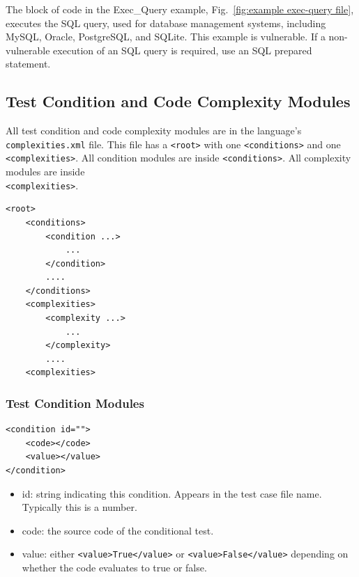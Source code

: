 \documentclass[12pt]{article}
\begin{document}
The block of code in the Exec\_Query example, 
Fig.~\ref{fig:example exec-query file}, executes the SQL query, used 
for database management
systems, including MySQL, Oracle, PostgreSQL, and SQLite.  This example is
vulnerable.  If a non-vulnerable execution of an SQL query is required,
use an SQL prepared statement.


\subsection{Test Condition and Code Complexity Modules}

All test condition and code complexity modules are in the 
language's \verb|complexities.xml| file.  This file has
a \verb|<root>| with one \verb|<conditions>| and one
\verb|<complexities>|.
All condition modules are inside \verb|<conditions>|.  All
complexity modules are inside \\ \verb|<complexities>|.

\begin{verbatim}
<root>
    <conditions>
        <condition ...>
            ...
        </condition>
        ....
    </conditions>
    <complexities>
        <complexity ...>
            ...
        </complexity>
        ....
    <complexities>
\end{verbatim}

\subsubsection{Test Condition Modules}
\label{sec: condition modules}

\begin{verbatim}
<condition id="">
    <code></code>
    <value></value>
</condition>
\end{verbatim}

\begin{itemize}
    \item id: string indicating this condition.  Appears in the test case
      file name.  Typically this is a number.
    
    \item code: the source code of the conditional test.

    \item value: either \verb|<value>True</value>| or
        \verb|<value>False</value>| depending on \\
        whether the code evaluates to true or false.
\end{itemize}
\end{document}

